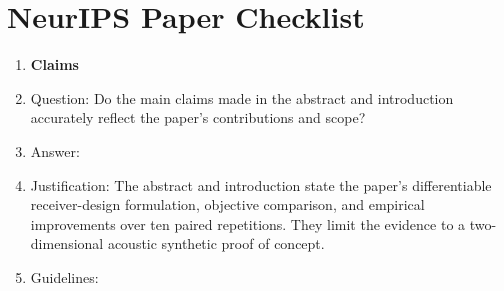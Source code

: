 \section*{NeurIPS Paper Checklist}

\begin{enumerate}

\item {\bf Claims}
    \item[] Question: Do the main claims made in the abstract and introduction accurately reflect the paper's contributions and scope?
    \item[] Answer: \answerYes{} %
    \item[] Justification: The abstract and introduction state the paper's
    differentiable receiver-design formulation, objective comparison, and
    empirical improvements over ten paired repetitions. They limit the evidence
    to a two-dimensional acoustic synthetic proof of concept.
    \item[] Guidelines:


\end{enumerate}

